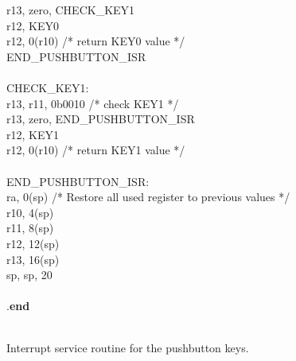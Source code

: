 \begin{figure}[h!]
\begin{center}
\begin{minipage}[t]{12.5 cm}
\begin{tabbing}
 \>r13, zero, CHECK\_KEY1\\
 \>r12, KEY0\\
 \>r12, 0(r10) \>/* return KEY0 value */\\
 \>END\_PUSHBUTTON\_ISR\\
~\\
CHECK\_KEY1:\\
 \>r13, r11, 0b0010 \>/* check KEY1 */\\
 \>r13, zero, END\_PUSHBUTTON\_ISR\\
 \>r12, KEY1\\
 \>r12, 0(r10) \>/* return KEY1 value */\\
~\\
END\_PUSHBUTTON\_ISR:\\
 \>ra, 0(sp) \>/* Restore all used register to previous values */\\
 \>r10, 4(sp)\\
 \>r11, 8(sp)\\
 \>r12, 12(sp)\\
 \>r13, 16(sp)\\
 \>sp, sp, 20\\
\\
\>.{\bf end}\\
~\\
\end{tabbing}
\end{minipage}
\end{center}
\vspace{-0.6 cm}\caption{Interrupt service routine for the pushbutton keys.}
   \label{fig:pushbutton_isr_s}
\end{figure}



